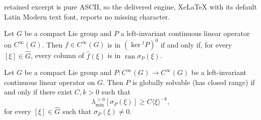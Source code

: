 \documentclass[10pt,a4paper]{amsart}
\begin{document}
retained excerpt is pure ASCII, so the delivered engine, XeLaTeX with its default Latin Modern text font, reports no missing character.
\begin{prop}\label{prop_kernel_annihi_range}
    Let $G$ be a compact Lie group and $P$ a left-invariant continuous linear operator on $C^\infty(G)$. Then $f\in C^\infty(G)$ is in $(\ker {}^tP)^{0}$ if and only if, for every $[\xi]\in\widehat{G}$, 
    every column of $\widehat{f}(\xi)$ is in  $\operatorname{ran}\sigma_P(\xi)$.
\end{prop}

\begin{prop}\label{prop_globally_solvable}
    Let $G$ be a compact Lie group and $P:C^\infty(G)\to C^\infty(G)$ be a left-invariant continuous linear operator on $G$. Then $P$ is globally solvable (has closed range)  if and only if there exist $C,k>0$ such that
    \begin{equation}\label{ineq_diof_gs}
        \lambda_{\min}^{>0}[\sigma_P(\xi)]\geq C\langle \xi\rangle^{-k},
    \end{equation}
    for every $[\xi]\in\widehat{G}$ such that $\sigma_P(\xi)\neq 0$.
\end{prop}
\end{document}
